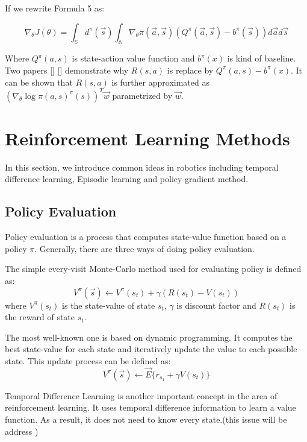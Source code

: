 \documentclass[officiallayout]{tktla}
\begin{document}
If we rewrite Formula 5 as:

\begin{equation}
\nabla_\theta J(\theta) = \int_\mathbb{S} d^\pi(\vec{s})\int_\mathbb{A}\nabla_\theta \pi(\vec{a}, \vec{s})(Q^\pi(\vec{a}, \vec{s}) -b^\pi(\vec{s}))d\vec{a}d\vec{s}
\end{equation}



Where $Q^\pi(a, s)$ is state-action value function and $b^\pi(x)$ is kind of baseline. Two
papers [] [] demonstrate why $R(s, a)$ is replace by $Q^\pi(a, s) - b^\pi(x)$. It can be
shown that $R(s, a)$ is further approximated as $(\nabla_\theta \log\pi(a,s)^\pi(s))^T \vec{w}$ parametrized by $\vec{w}$.
\section{Reinforcement Learning Methods}

In this section, we introduce common ideas in robotics including temporal difference learning, Episodic learning and policy gradient method.
\subsection{Policy Evaluation}
Policy evaluation is a process that computes state-value function based on a policy $\pi$. Generally, there are three ways of doing policy evaluation. 

The simple every-visit Monte-Carlo method used for evaluating policy is defined as:
\begin{equation}
V^\pi(\vec{s}) \leftarrow V^\pi(s_t) + \gamma (R(s_t) - V(s_t))
\end{equation}
where $V^\pi(s_t)$ is the state-value of state $s_t$, $\gamma$ is discount factor and $R(s_t)$ is the reward of state $s_t$. 

The most well-known one is based on dynamic programming. It computes the best state-value for each state and iteratively update the value to each possible state. This update process can be defined as:
\begin{equation}
V^\pi(\vec{s}) \leftarrow \vec{E}\{r_{s_1} + \gamma V(s_t)\}
\end{equation}

Temporal Difference Learning is another important concept in the area of reinforcement learning. It uses temporal difference information to learn a value function. As a result, it does not need to know every state.(this issue will be address )
\end{document}
